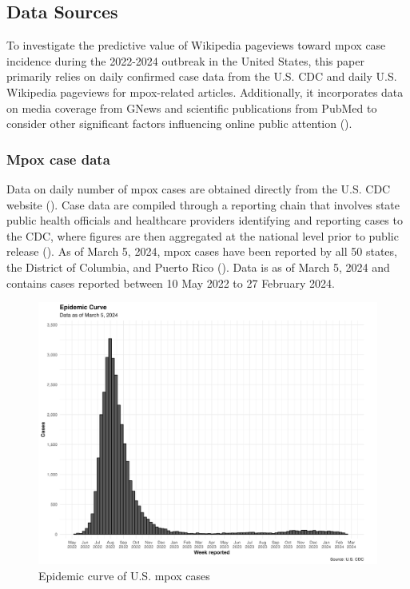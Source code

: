 \documentclass[
  12pt,
]{article}
\begin{document}
\subsection{Data Sources}\label{data-sources}

To investigate the predictive value of Wikipedia pageviews toward mpox
case incidence during the 2022-2024 outbreak in the United States, this
paper primarily relies on daily confirmed case data from the U.S. CDC
and daily U.S. Wikipedia pageviews for mpox-related articles.
Additionally, it incorporates data on media coverage from GNews and
scientific publications from PubMed to consider other significant
factors influencing online public attention
().

\subsubsection{Mpox case data}\label{mpox-case-data}

Data on daily number of mpox cases are obtained directly from the U.S.
CDC website (). Case data are compiled
through a reporting chain that involves state public health officials
and healthcare providers identifying and reporting cases to the CDC,
where figures are then aggregated at the national level prior to public
release (). As of March 5,
2024, mpox cases have been reported by all 50 states, the District of
Columbia, and Puerto Rico (). Data is as
of March 5, 2024 and contains cases reported between 10 May 2022 to 27
February 2024.

\begin{figure}[H]

{\centering \includegraphics{images/cases.png}

}

\caption{Epidemic curve of U.S. mpox cases}

\end{figure}%
\end{document}
